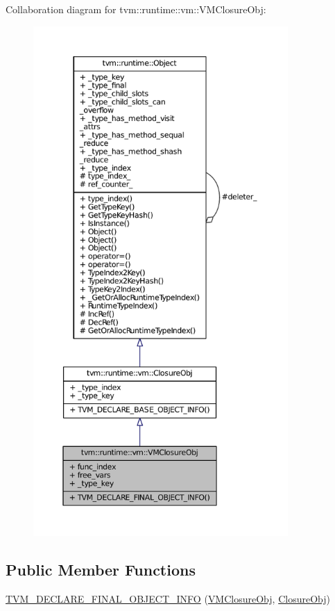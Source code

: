 Collaboration diagram for tvm\+:\+:runtime\+:\+:vm\+:\+:V\+M\+Closure\+Obj\+:
\nopagebreak
\begin{figure}[H]
\begin{center}
\leavevmode
\includegraphics[height=550pt]{classtvm_1_1runtime_1_1vm_1_1VMClosureObj__coll__graph}
\end{center}
\end{figure}
\subsection*{Public Member Functions}
\begin{DoxyCompactItemize}
\item 
\hyperlink{classtvm_1_1runtime_1_1vm_1_1VMClosureObj_aedda640042860f3347846735822bb464}{T\+V\+M\+\_\+\+D\+E\+C\+L\+A\+R\+E\+\_\+\+F\+I\+N\+A\+L\+\_\+\+O\+B\+J\+E\+C\+T\+\_\+\+I\+N\+FO} (\hyperlink{classtvm_1_1runtime_1_1vm_1_1VMClosureObj}{V\+M\+Closure\+Obj}, \hyperlink{classtvm_1_1runtime_1_1vm_1_1ClosureObj}{Closure\+Obj})
\end{DoxyCompactItemize}
